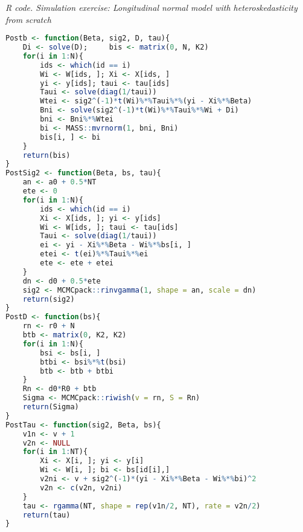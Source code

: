 \begin{tcolorbox}[enhanced,width=4.67in,center upper,
	fontupper=\large\bfseries,drop shadow southwest,sharp corners]
	\textit{R code. Simulation exercise: Longitudinal normal model with heteroskedasticity from scratch}
	\begin{VF}
		\begin{lstlisting}[language=R]
Postb <- function(Beta, sig2, D, tau){
	Di <- solve(D); 	bis <- matrix(0, N, K2)
	for(i in 1:N){
		ids <- which(id == i)
		Wi <- W[ids, ]; Xi <- X[ids, ]
		yi <- y[ids]; taui <- tau[ids]
		Taui <- solve(diag(1/taui))
		Wtei <- sig2^(-1)*t(Wi)%*%Taui%*%(yi - Xi%*%Beta)
		Bni <- solve(sig2^(-1)*t(Wi)%*%Taui%*%Wi + Di)
		bni <- Bni%*%Wtei
		bi <- MASS::mvrnorm(1, bni, Bni)
		bis[i, ] <- bi
	}
	return(bis)
}
PostSig2 <- function(Beta, bs, tau){
	an <- a0 + 0.5*NT
	ete <- 0
	for(i in 1:N){
		ids <- which(id == i)
		Xi <- X[ids, ]; yi <- y[ids]
		Wi <- W[ids, ]; taui <- tau[ids]
		Taui <- solve(diag(1/taui))
		ei <- yi - Xi%*%Beta - Wi%*%bs[i, ]
		etei <- t(ei)%*%Taui%*%ei
		ete <- ete + etei
	}
	dn <- d0 + 0.5*ete 
	sig2 <- MCMCpack::rinvgamma(1, shape = an, scale = dn)
	return(sig2)
}
PostD <- function(bs){
	rn <- r0 + N
	btb <- matrix(0, K2, K2)
	for(i in 1:N){
		bsi <- bs[i, ]
		btbi <- bsi%*%t(bsi)
		btb <- btb + btbi
	}
	Rn <- d0*R0 + btb
	Sigma <- MCMCpack::riwish(v = rn, S = Rn)
	return(Sigma)
}
PostTau <- function(sig2, Beta, bs){
	v1n <- v + 1
	v2n <- NULL
	for(i in 1:NT){
		Xi <- X[i, ]; yi <- y[i]
		Wi <- W[i, ]; bi <- bs[id[i],]
		v2ni <- v + sig2^(-1)*(yi - Xi%*%Beta - Wi%*%bi)^2
		v2n <- c(v2n, v2ni)
	}
	tau <- rgamma(NT, shape = rep(v1n/2, NT), rate = v2n/2)
	return(tau)
}
\end{lstlisting}
	\end{VF}
\end{tcolorbox}


